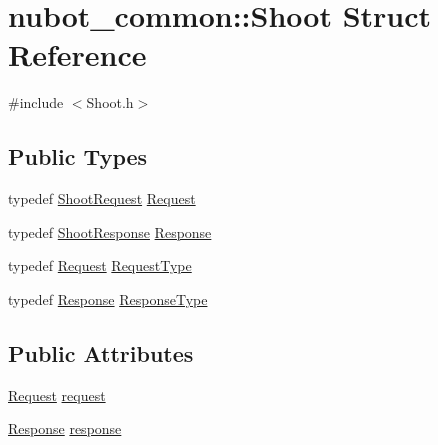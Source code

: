 \hypertarget{structnubot__common_1_1Shoot}{\section{nubot\-\_\-common\-:\-:Shoot Struct Reference}
\label{structnubot__common_1_1Shoot}
}


{\ttfamily \#include $<$Shoot.\-h$>$}

\subsection*{Public Types}
\begin{DoxyCompactItemize}
\item 
typedef \hyperlink{namespacenubot__common_ab115c969a87ffc5940d2f26488a5baa3}{Shoot\-Request} \hyperlink{structnubot__common_1_1Shoot_a8d200603298d1fe7377f13911e7d5bdc}{Request}
\item 
typedef \hyperlink{namespacenubot__common_a7fc7346cebf4ea3bdbc7c25438d3959e}{Shoot\-Response} \hyperlink{structnubot__common_1_1Shoot_a4d609a5e9faac9c7c0d32b7cf0eb5738}{Response}
\item 
typedef \hyperlink{structnubot__common_1_1Shoot_a8d200603298d1fe7377f13911e7d5bdc}{Request} \hyperlink{structnubot__common_1_1Shoot_a00fabefc36af40105d07c4ad3373f0e2}{Request\-Type}
\item 
typedef \hyperlink{structnubot__common_1_1Shoot_a4d609a5e9faac9c7c0d32b7cf0eb5738}{Response} \hyperlink{structnubot__common_1_1Shoot_a7a2ab7b3d778ea57959a3f760ca447ea}{Response\-Type}
\end{DoxyCompactItemize}
\subsection*{Public Attributes}
\begin{DoxyCompactItemize}
\item 
\hyperlink{structnubot__common_1_1Shoot_a8d200603298d1fe7377f13911e7d5bdc}{Request} \hyperlink{structnubot__common_1_1Shoot_a928906d0aad7d7ced9018bc3a29dfdcf}{request}
\item 
\hyperlink{structnubot__common_1_1Shoot_a4d609a5e9faac9c7c0d32b7cf0eb5738}{Response} \hyperlink{structnubot__common_1_1Shoot_ad087c631d279c2f929abf994fc814db5}{response}
\end{DoxyCompactItemize}


